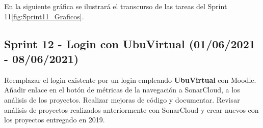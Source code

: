 En la siguiente gráfica se ilustrará el transcurso de las tareas del Sprint 11\ref{fig:Sprint11_Graficos}.



\subsection{Sprint 12 - Login con UbuVirtual (01/06/2021 - 08/06/2021)}
Reemplazar el login existente por un login empleando \textbf{UbuVirtual} con Moodle. Añadir enlace en el botón de métricas de la navegación a SonarCloud, a los análisis de los proyectos. Realizar mejoras de código y documentar. Revisar análisis de proyectos realizados anteriormente con SonarCloud y crear nuevos con los proyectos entregado en 2019.

